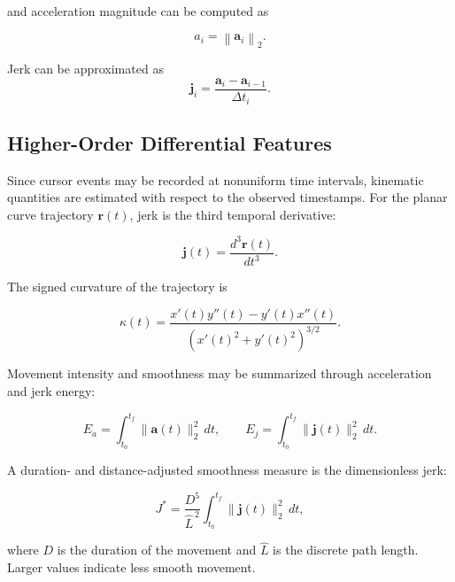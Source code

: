 \documentclass[conference]{IEEEtran}
\begin{document}
and acceleration magnitude can be computed as

\begin{equation}
a_i
=
\left\|
\mathbf{a}_i
\right\|_2.
\label{eq:acceleration_magnitude}
\end{equation}

Jerk can be approximated as
\begin{equation}
\mathbf{j}_i
=
\frac{\mathbf{a}_i-\mathbf{a}_{i-1}}{\Delta t_i}.
\label{eq:jerk}
\end{equation}

\subsection{Higher-Order Differential Features}

Since cursor events may be recorded at nonuniform time intervals, kinematic quantities are estimated with respect to the observed timestamps. For the planar curve trajectory $\mathbf{r}(t)$, jerk is the third temporal derivative:

\begin{equation}
\mathbf{j}(t)
=
\frac{d^3\mathbf{r}(t)}{dt^3}.
\label{eq:continuous_jerk}
\end{equation}

The signed curvature of the trajectory is

\begin{equation}
\kappa(t)
=
\frac{
x'(t)y''(t)-y'(t)x''(t)
}{
\left(x'(t)^2+y'(t)^2\right)^{3/2}
}.
\label{eq:signed_curvature}
\end{equation}



Movement intensity and smoothness may be summarized through acceleration
and jerk energy:

\begin{equation}
E_a
=
\int_{t_0}^{t_f}
\|\mathbf{a}(t)\|_2^2\,dt,
\qquad
E_j
=
\int_{t_0}^{t_f}
\|\mathbf{j}(t)\|_2^2\,dt.
\label{eq:acceleration_jerk_energy}
\end{equation}

A duration- and distance-adjusted smoothness measure is the dimensionless
jerk:

\begin{equation}
J^{*}
=
\frac{D^5}{\widehat{L}^{\,2}}
\int_{t_0}^{t_f}
\|\mathbf{j}(t)\|_2^2\,dt,
\label{eq:dimensionless_jerk}
\end{equation}

where $D$ is the duration of the movement and $\widehat{L}$ is the discrete path
length. Larger values indicate less smooth movement.
\end{document}
